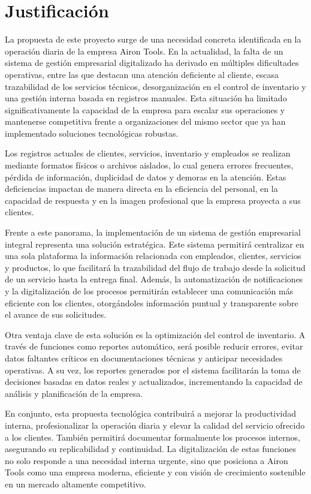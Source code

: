 \section{Justificación}

La propuesta de este proyecto surge de una necesidad concreta identificada en la operación diaria de la empresa Airon Tools. En la actualidad, la falta de un sistema de gestión empresarial digitalizado ha derivado en múltiples dificultades operativas, entre las que destacan una atención deficiente al cliente, escasa trazabilidad de los servicios técnicos, desorganización en el control de inventario y una gestión interna basada en registros manuales. Esta situación ha limitado significativamente la capacidad de la empresa para escalar sus operaciones y mantenerse competitiva frente a organizaciones del mismo sector que ya han implementado soluciones tecnológicas robustas.

Los registros actuales de clientes, servicios, inventario y empleados se realizan mediante formatos físicos o archivos aislados, lo cual genera errores frecuentes, pérdida de información, duplicidad de datos y demoras en la atención. Estas deficiencias impactan de manera directa en la eficiencia del personal, en la capacidad de respuesta y en la imagen profesional que la empresa proyecta a sus clientes.

Frente a este panorama, la implementación de un sistema de gestión empresarial integral representa una solución estratégica. Este sistema permitirá centralizar en una sola plataforma la información relacionada con empleados, clientes, servicios y productos, lo que facilitará la trazabilidad del flujo de trabajo desde la solicitud de un servicio hasta la entrega final. Además, la automatización de notificaciones y la digitalización de los procesos permitirán establecer una comunicación más eficiente con los clientes, otorgándoles información puntual y transparente sobre el avance de sus solicitudes.

Otra ventaja clave de esta solución es la optimización del control de inventario. A través de funciones como reportes automático, será posible reducir errores, evitar datos faltantes críticos en documentaciones técnicas y anticipar necesidades operativas. A su vez, los reportes generados por el sistema facilitarán la toma de decisiones basadas en datos reales y actualizados, incrementando la capacidad de análisis y planificación de la empresa.

En conjunto, esta propuesta tecnológica contribuirá a mejorar la productividad interna, profesionalizar la operación diaria y elevar la calidad del servicio ofrecido a los clientes. También permitirá documentar formalmente los procesos internos, asegurando su replicabilidad y continuidad. La digitalización de estas funciones no solo responde a una necesidad interna urgente, sino que posiciona a Airon Tools como una empresa moderna, eficiente y con visión de crecimiento sostenible en un mercado altamente competitivo.

